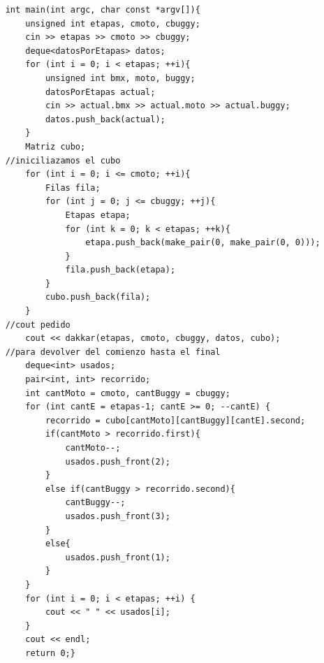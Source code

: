 	\begin{codesnippet}
	\begin{verbatim}
    int main(int argc, char const *argv[]){
        unsigned int etapas, cmoto, cbuggy;
        cin >> etapas >> cmoto >> cbuggy;
        deque<datosPorEtapas> datos;
        for (int i = 0; i < etapas; ++i){
            unsigned int bmx, moto, buggy;
            datosPorEtapas actual;
            cin >> actual.bmx >> actual.moto >> actual.buggy;
            datos.push_back(actual);
        }
        Matriz cubo;
    //iniciliazamos el cubo
        for (int i = 0; i <= cmoto; ++i){
            Filas fila;
            for (int j = 0; j <= cbuggy; ++j){
                Etapas etapa;
                for (int k = 0; k < etapas; ++k){
                    etapa.push_back(make_pair(0, make_pair(0, 0)));
                }
                fila.push_back(etapa);
            }
            cubo.push_back(fila);
        }
    //cout pedido
        cout << dakkar(etapas, cmoto, cbuggy, datos, cubo);
    //para devolver del comienzo hasta el final
        deque<int> usados;
        pair<int, int> recorrido;
        int cantMoto = cmoto, cantBuggy = cbuggy;
        for (int cantE = etapas-1; cantE >= 0; --cantE) {
            recorrido = cubo[cantMoto][cantBuggy][cantE].second;
            if(cantMoto > recorrido.first){
                cantMoto--;
                usados.push_front(2);
            }
            else if(cantBuggy > recorrido.second){
                cantBuggy--;
                usados.push_front(3);
            }
            else{
                usados.push_front(1);
            }
        }
        for (int i = 0; i < etapas; ++i) {
            cout << " " << usados[i];
        }
        cout << endl;
        return 0;}
	\end{verbatim}
	\end{codesnippet}

